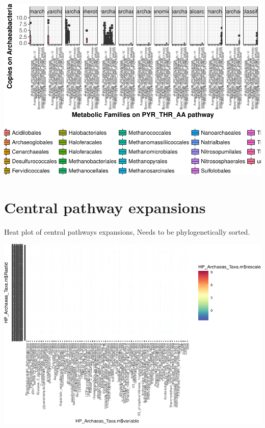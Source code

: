 \documentclass[12pt,twoside]{reedthesis}
\begin{document}
  \begin{center}\includegraphics{tesis_files/figure-latex/ArcheaeBoxPlotByPhylum-10} \end{center}
  
  \begin{Shaded}
  \begin{Highlighting}[]
  
  \end{Highlighting}
  \end{Shaded}
  
  \clearpage 
  
  \section{Central pathway expansions}\label{central-pathway-expansions}
  
  Heat plot of central pathways expansions, Needs to be phylogenetically
  sorted.
  
  \begin{center}\includegraphics{tesis_files/figure-latex/ArchaeaHeatPlots-1} \end{center}
  
\end{document}
